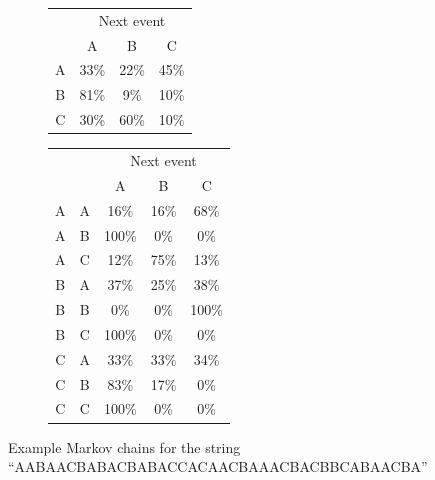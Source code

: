 \documentclass[]{article}
\begin{document}
                \begin{figure}[h]
                    \begin{center}
                        \begin{subfigure}[a]{0.4\textwidth}
                            \begin{tabular}{|c|c|c|c|}
                                \hline
                                & \multicolumn{3}{|c|}{Next event} \\ \cline{2-4}
                                & A & B & C \\ \hline
                                A & 33\% & 22\% & 45\% \\ \hline
                                B & 81\% & 9\% & 10\% \\ \hline
                                C & 30\% & 60\% & 10\% \\ \hline
                            \end{tabular}
                        \end{subfigure}
                        \begin{subfigure}[b]{0.4\textwidth}
                            \begin{tabular}{|c|c|c|c|c|}
                                \hline
                                \multicolumn{2}{|c|}{} & \multicolumn{3}{|c|}{Next event} \\ \cline{3-5}
                                \multicolumn{2}{|c|}{} & A & B & C \\ \hline
                                A & A & 16\% & 16\% & 68\% \\ \hline
                                A & B & 100\% & 0\% & 0\% \\ \hline
                                A & C & 12\% & 75\% & 13\% \\ \hline
                                B & A & 37\% & 25\% & 38\% \\ \hline
                                B & B & 0\% & 0\% & 100\% \\ \hline
                                B & C & 100\% & 0\% & 0\% \\ \hline
                                C & A & 33\% & 33\% & 34\% \\ \hline
                                C & B & 83\% & 17\% & 0\% \\ \hline
                                C & C & 100\% & 0\% & 0\% \\ \hline
                            \end{tabular}
                        \end{subfigure}
                    \end{center}
                    \caption{Example Markov chains for the string \\``AABAACBABACBABACCACAACBAAACBACBBCABAACBA''}
                    \label{fig:markov}
                \end{figure}
                \newpage
\end{document}
